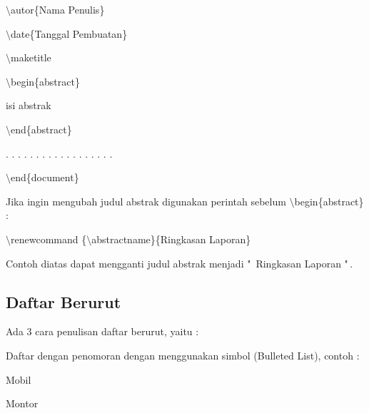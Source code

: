 $\setminus$autor\{Nama Penulis\}\par \vspace{12pt}

$\setminus$date\{Tanggal Pembuatan\}\par \vspace{12pt}

$\setminus$maketitle\par \vspace{12pt}

$\setminus$begin\{abstract\}\par \vspace{12pt}

isi abstrak\par \vspace{12pt}

$\setminus$end\{abstract\}\par \vspace{12pt}

. . . . . . . . . . . . . . . . . .\par \vspace{12pt}

$\setminus$end\{document\}\par \vspace{12pt}

Jika ingin mengubah judul abstrak digunakan perintah sebelum 
$\setminus$begin\{abstract\} :

$\setminus$renewcommand \{$\setminus$abstractname\}\{Ringkasan Laporan\}\par \vspace{12pt}

Contoh diatas dapat mengganti judul abstrak menjadi "\, Ringkasan Laporan "\,.\par \vspace{12pt}

\subsection {Daftar Berurut}\par \vspace{12pt}

Ada 3 cara penulisan daftar berurut, yaitu :

Daftar dengan penomoran dengan menggunakan simbol (Bulleted List), contoh :

Mobil\par \vspace{12pt}

Montor\par \vspace{12pt}


